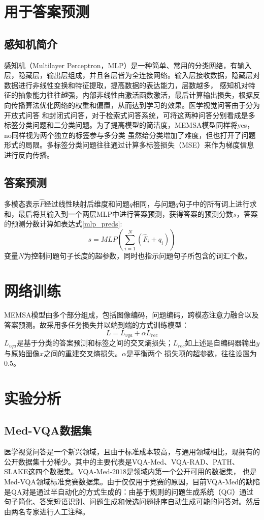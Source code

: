 \section{用于答案预测}
\subsection{感知机简介}
感知机（Multilayer Perceptron，MLP）是一种简单、常用的分类网络，有输入层，隐藏层，输出层组成，并且各层皆为全连接网络。输入层接收数据，隐藏层对数据进行非线性变换和特征提取，提高数据的表达能力，层数越多，
感知机对特征的抽象能力往往越强，内部非线性由激活函数激活，最后计算输出损失，根据反向传播算法优化网络的权重和偏置，从而达到学习的效果。医学视觉问答由于分为开放式问答
和封闭式问答，对于检索式问答系统，可将这两种问答分别看成是多标签分类问题和二分类问题。为了提高模型的简洁度，MEMSA模型同样将yes，no同样视为两个独立的标签参与多分类
虽然给分类增加了难度，但也打开了问题形式的局限。多标签分类问题往往通过计算多标签损失（MSE）来作为梯度信息进行反向传播。

\subsection{答案预测}
多模态表示$\hat{F}$经过线性映射后维度和问题$q$相同，与问题$q$句子中的所有词上进行求和，最后将其输入到一个两层MLP中进行答案预测，获得答案的预测分数$s$，答案的预测分数计算如表达式\eqref{mlp_preds}:
\begin{equation}
	\label{mlp_preds}
	s=M L P\left(\sum_{i=1}^{N}\left(\hat{F}_i+q_i\right)\right) 
\end{equation}
变量$N$为控制问题句子长度的超参数，同时也指示问题句子所包含的词汇个数。

\section{网络训练}
MEMSA模型由多个部分组成，包括图像编码，问题编码，跨模态注意力融合以及答案预测。故采用多任务损失并以端到端的方式训练模型：
\begin{equation}
	\label{}
	L=L_{vqa}+\alpha L_{rec} 
\end{equation}
$L_{vqa}$是基于分类的答案预测和标签之间的交叉熵损失；$L_{rec}$如上述是自编码器输出$y$与原始图像$x$之间的重建交叉熵损失。$\alpha$是平衡两个
损失项的超参数，往往设置为0.5。

\section{实验分析}
\subsection{Med-VQA数据集}
医学视觉问答是一个新兴领域，且由于标准成本较高，与通用领域相比，现拥有的公开数据集十分稀少。其中的主要代表是VQA-Med、VQA-RAD、PATH、SLAKE这四个数据集。VQA-Med-2018\cite{hasan2018overview}是领域内第一个公开可用的数据集，
也是Med-VQA领域标准竞赛数据集。由于仅仅用于竞赛的原因，目前VQA-Med的缺陷是QA对是通过半自动化的方式生成的：由基于规则的问题生成系统（QG）通过句子简化、答案短语识别、问题生成和候选问题排序自动生成可能的问答对。然后由两名专家进行人工注释。

